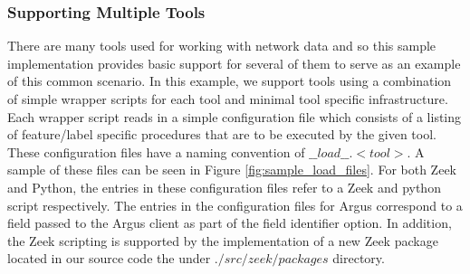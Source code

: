 \documentclass[sigconf, anonymous, screen, review]{acmart}
\begin{document}
\subsubsection{Supporting Multiple Tools}\label{subsubsec:tool_support}
There are many tools used for working with network data and so this sample implementation provides basic support for several of them to serve as an example of this common scenario.
In this example, we support tools using a combination of simple wrapper scripts for each tool and minimal tool specific infrastructure.
Each wrapper script reads in a simple configuration file which consists of a listing of feature/label specific procedures that are to be executed by the given tool.
These configuration files have a naming convention of $\_\_load\_\_.<tool>$.
A sample of these files can be seen in Figure \ref{fig:sample_load_files}.
For both Zeek and Python, the entries in these configuration files refer to a Zeek and python script respectively.
The entries in the configuration files for Argus correspond to a field passed to the Argus client as part of the field identifier option.
In addition, the Zeek scripting is supported by the implementation of a new Zeek package located in our source code the under $./src/zeek/packages$ directory.
\end{document}
